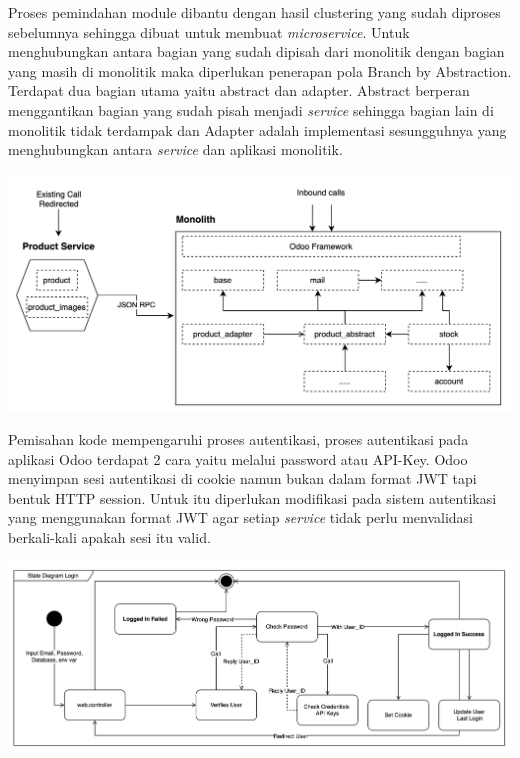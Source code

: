 Proses pemindahan module dibantu dengan hasil clustering yang sudah diproses sebelumnya sehingga dibuat untuk membuat \textit{microservice}. Untuk menghubungkan antara bagian yang sudah dipisah dari monolitik dengan bagian yang masih di monolitik maka diperlukan penerapan pola Branch by Abstraction. Terdapat dua bagian utama yaitu abstract dan adapter. Abstract berperan menggantikan bagian yang sudah pisah menjadi \textit{service} sehingga bagian lain di monolitik tidak terdampak dan Adapter adalah implementasi sesungguhnya yang menghubungkan antara \textit{service} dan aplikasi monolitik.

\begin{center}
	\includegraphics[width=14cm]{img/bab_3/strangelExMicro.png}
	\label{fig:asd}
\end{center}

Pemisahan kode mempengaruhi proses autentikasi, proses autentikasi pada aplikasi Odoo terdapat 2 cara yaitu melalui password atau API-Key. Odoo menyimpan sesi autentikasi di cookie namun bukan dalam format JWT tapi bentuk HTTP session. Untuk itu diperlukan modifikasi pada sistem autentikasi yang menggunakan format JWT agar setiap \textit{service} tidak perlu menvalidasi berkali-kali apakah sesi itu valid. 

\begin{center}
	\includegraphics[width=14cm]{img/bab_3/stateDiagramLogin.png}
	\label{fig:asd}
\end{center}

